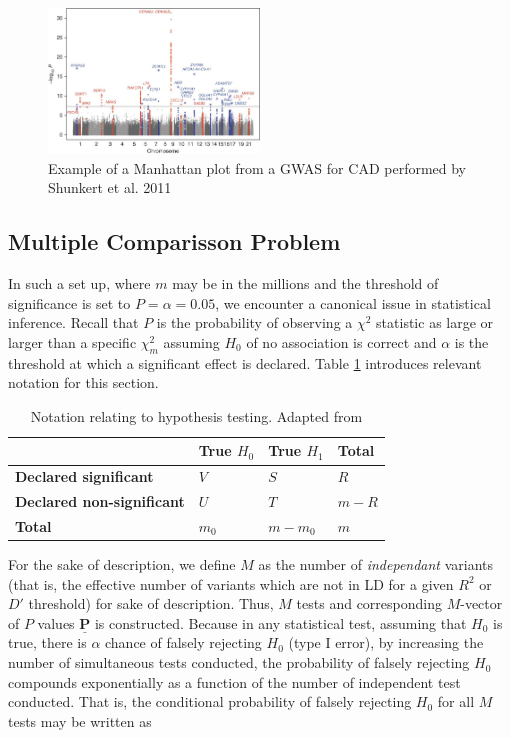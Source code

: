 \begin{figure}[H]
\caption{Example of a Manhattan plot from a \ac{GWAS} for \ac{CAD} performed by Shunkert et al. 2011}
\centering
\includegraphics[width=0.5\textwidth]{Figures/man_ex.jpg}
\end{figure}

\subsection{Multiple Comparisson Problem}

In such a set up, where $m$ may be in the millions and the threshold of significance is set to $P = \alpha = 0.05$, we encounter a canonical issue in statistical inference. Recall that $P$ is the probability of observing a $\chi^2$ statistic as large or larger than a specific $\chi^2_m$ assuming $H_0$ of no association is correct and $\alpha$ is the threshold at which a significant effect is declared. Table \ref{hyptest} introduces relevant notation for this section. 


\begin{table}[H]
\centering
\caption{Notation relating to hypothesis testing. Adapted from \cite{Sun2006}}
\label{hyptest}
\begin{tabular*}{.8\linewidth}{@{}llll@{}}
\toprule
                                  & \textbf{True $H_0$} & \textbf{True $H_1$} & \textbf{Total} \\ \midrule
\textbf{Declared significant}     & $V$                 & $S$                 & $R$            \\
\textbf{Declared non-significant} & $U$                 & $T$                 & $m - R$        \\
\textbf{Total}                    & $m_0$               & $m - m_0$           & $m$            \\ \bottomrule
\end{tabular*}
\end{table}


For the sake of description, we define $M$ as the number of \textit{independant} variants (that is, the effective number of variants which are not in \ac{LD} for a given $R^2$ or $D'$ threshold) for sake of description. Thus, $M$ tests and corresponding $M$-vector of $P$ values $\underline{\mathbf{P}}$ is constructed. Because in any statistical test, assuming that $H_0$ is true, there is $\alpha$ chance of falsely rejecting $H_0$ (type I error), by increasing the number of simultaneous tests conducted, the probability of falsely rejecting $H_0$ compounds exponentially as a function of the number of independent test conducted. That is, the conditional probability of falsely rejecting $H_0$ for all $M$ tests may be written as 

